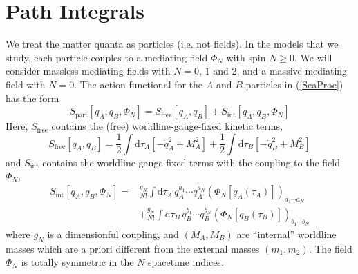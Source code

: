 \section{Path Integrals\label{sec3}}
We treat the matter quanta as particles (i.e. not fields). In the models that we study, each particle couples to a mediating field $\Phi_{N}$ with spin $N \geq 0$. We will consider massless mediating fields with $N = 0$, $1$ and $2$, and a massive mediating field with $N = 0$. The action functional for the $A$ and $B$ particles in (\ref{ScaProc}) has the form
\begin{equation}
	S_{\text{part}}[ q_{A}, q_{B}, \Phi_{N} ] = S_{\text{free}}[ q_{A}, q_{B} ] + S_{\text{int}}[ q_{A}, q_{B}, \Phi_{N} ] \label{SP}
\end{equation}
Here, $S_{\text{free}}$ contains the (free) worldline-gauge-fixed kinetic terms,
\begin{equation}
	S_{\text{free}}[ q_{A}, q_{B} ] = \frac{1}{2}\int \mathrm{d}\tau_{A} \left[-\dot{q}_{A}^{2} + M_{A}^{2} \right] + \frac{1}{2} \int \mathrm{d}\tau_{B} \left[- \dot{q}_{B}^{2} + M_{B}^{2} \right]
\end{equation}
and $S_{\text{int}}$ contains the worldline-gauge-fixed terms with the coupling to the field $\Phi_{N}$,
\begin{equation}
\begin{split}
	S_{\text{int}}[ q_{A}, q_{B}, \Phi_{N} ] = {}& \frac{g_{N}}{N!} \int \mathrm{d} \tau_{A} \, \dot{q}_{A}^{a_{1}} \cdots \dot{q}_{A}^{a_{N}} (\Phi_{N}[q_{A}(\tau_{A})])_{a_{1} \cdots a_{N}} \\
	&+ \frac{g_{N}}{N!} \int \mathrm{d} \tau_{B} \, \dot{q}_{B}^{b_{1}} \cdots \dot{q}_{B}^{b_{N}} (\Phi_{N}[q_{B}(\tau_{B})])_{b_{1} \cdots b_{N}}
\end{split} \label{Sint}
\end{equation}
where $g_{N}$ is a dimensionful coupling, and $(M_{A}, M_{B})$ are ``internal'' worldline masses which are a priori different from the external masses $(m_{1}, m_{2})$. The field $\Phi_{N}$ is totally symmetric in the $N$ spacetime indices.

